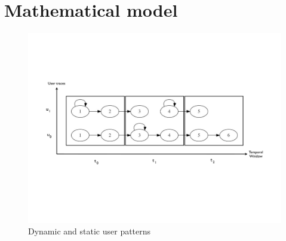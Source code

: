 \newpage

\section{Mathematical model}
\label{sec:math_model}

\begin{figure}[h]
\begin{center}
\includegraphics[scale =0.5] {mathematical_definition/images/dynamic_users.pdf}
\caption{Dynamic and static user patterns}
\label{fig:matehematical_model}
\end{center}
\end{figure}


